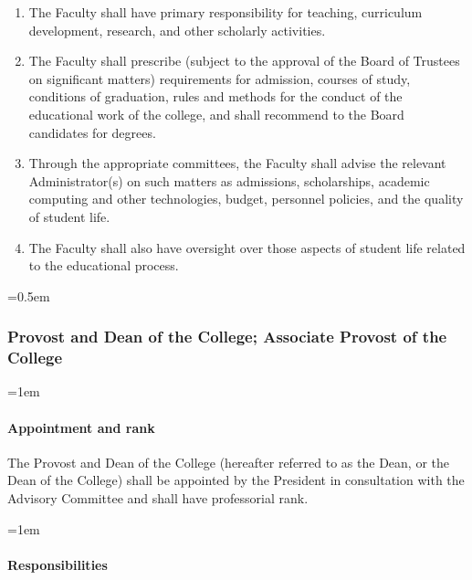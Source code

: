 \documentclass{manual}
\let\oldsubsubsection\subsubsection
\renewcommand\subsubsection{\leftskip=0.5em\oldsubsubsection}
\let\oldparagraph\paragraph
\renewcommand\paragraph{\leftskip=1em\oldparagraph}
\newcommand{\itemLevelA}{\alph*.}
\newcommand{\itemRefA}{\alph*}
\begin{document}
				\begin{enumerate}[label=\itemLevelA,ref=\itemRefA]
				\item The Faculty shall have primary responsibility for teaching, curriculum development, research, and other scholarly activities.
				\item The Faculty shall prescribe (subject to the approval of the Board of Trustees on significant matters) requirements for admission, courses of study, conditions of graduation, rules and methods for the conduct of the educational work of the college, and shall recommend to the Board candidates for degrees.
				\item Through the appropriate committees, the Faculty shall advise the relevant Administrator(s) on such matters as admissions, scholarships, academic computing and other technologies, budget, personnel policies, and the quality of student life.
				\item The Faculty shall also have oversight over those aspects of student life related to the educational process. 
				\end{enumerate}

		\subsubsection{Provost and Dean of the College; Associate Provost of the College}

			\paragraph{Appointment and rank}
			The Provost and Dean of the College (hereafter referred to as the Dean, or the Dean of the College) shall be appointed by the President in consultation with the Advisory Committee and shall have professorial rank.

			\paragraph{Responsibilities}
\end{document}
